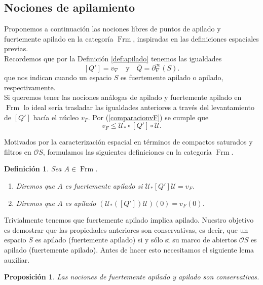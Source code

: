 \documentclass[12pt]{article}
\newtheorem{dfn}[thm]{Definición}
\newtheorem{prop}[thm]{Proposición}
\DeclareMathOperator{\Frm}{Frm}
\begin{document}
\subsection{Nociones de apilamiento}\label{N. Apilamiento}
Proponemos a continuación las nociones libres de puntos de apilado y fuertemente apilado en la categoría $\Frm$, inspiradas en las
definiciones espaciales previas.\\

Recordemos que por la Definición \ref{def:apilado} tenemos las igualdades
\[
[Q']=v_\nabla\quad \text{y}\quad\overline{Q}=\partial_\nabla^\infty(S).
\]
que nos indican cuando un espacio $S$ es fuertemente apilado o apilado, respectivamente.\\

Si queremos tener las nociones análogas de apilado y fuertemente apilado en $\Frm$ lo ideal sería trasladar las igualdades anteriores
a través del levantamiento de $[Q']$ hacía el núcleo $v_F$. Por (\ref{comparacionvF}) se cumple que 
\[
v_F\leq \mathcal{U}_*\circ [Q']\circ \mathcal{U}.
\]

Motivados por la caracterización espacial en términos de compactos saturados y filtros en $\mathcal{O}S$, formulamos las siguientes definiciones
en la categoría $\Frm$. 
\begin{dfn}\label{def:apilado-marcos}
Sea $A\in \Frm$.
\begin{enumerate}
  \item Diremos que $A$ es fuertemente apilado si $\mathcal{U}_*[Q']\mathcal{U}=v_F$.
  \item Diremos que $A$ es apilado $(\mathcal{U}_*([Q'])\mathcal{U})(0)=v_F(0)$.
\end{enumerate}
\end{dfn}

Trivialmente tenemos que fuertemente apilado implica apilado. Nuestro objetivo es demostrar que las propiedades anteriores son conservativas, es decir, que un espacio $S$ es apilado (fuertemente apilado) si y sólo si su marco de abiertos $\mathcal{O}S$ es apilado (fuertemente apilado). 
Antes de hacer esto necesitamos el siguiente lema auxiliar.

\begin{prop}\label{apiladoconservativa}
Las nociones de fuertemente apilado y apilado son conservativas.
\end{prop}
\end{document}
